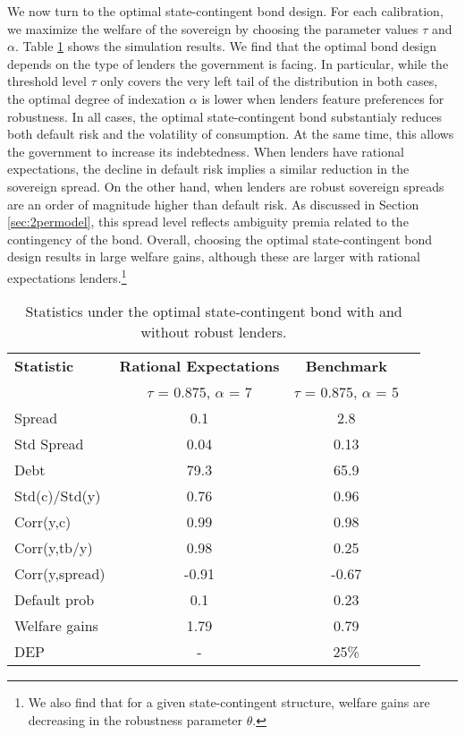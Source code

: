 We now turn to the optimal state-contingent bond design. For each calibration, we maximize the welfare of the sovereign by choosing the parameter values $\tau$ and $\alpha$. Table \ref{table:optimal_structure} shows the simulation results. We find that the optimal bond design depends on the type of lenders the government is facing. In particular, while the threshold level $\tau$ only covers the very left tail of the distribution in both cases, the optimal degree of indexation $\alpha$ is lower when lenders feature preferences for robustness. In all cases, the optimal state-contingent bond substantialy reduces both default risk and the volatility of consumption. At the same time, this allows the government to increase its indebtedness. When lenders have rational expectations, the decline in default risk implies a similar reduction in the sovereign spread. On the other hand, when lenders are robust sovereign spreads are an order of magnitude higher than default risk. As discussed in Section \ref{sec:2permodel}, this spread level reflects ambiguity premia related to the contingency of the bond. Overall, choosing the optimal state-contingent bond design results in large welfare gains, although these are larger with rational expectations lenders.\footnote{We also find that for a given state-contingent structure, welfare gains are decreasing in the robustness parameter $\theta$.}



\begin{table}[!hbtp]\centering\small 
  \caption{Statistics under the optimal state-contingent bond with and without robust lenders.} \label{table:optimal_structure}
  \begin{tabular}{@{}lccc@{}}\toprule
  \textbf{Statistic}  & \textbf{Rational Expectations} & \textbf{Benchmark}  \\
  & $\tau$ = 0.875, $\alpha$ = 7 & $\tau$ = 0.875, $\alpha$ = 5 &\\\midrule
  Spread &   0.1          &       2.8        \\
  Std Spread &   0.04          &         0.13            \\
  Debt &   79.3         &           65.9           \\
  Std(c)/Std(y) &   0.76         &           0.96          \\
  Corr(y,c) &   0.99        &           0.98        \\
  Corr(y,tb/y) &   0.98        &           0.25      \\
  Corr(y,spread) &   -0.91        &          -0.67       \\
  Default prob &  0.1             &    0.23                  \\
  Welfare gains & 1.79              & 0.79                 \\
  DEP & -              & 25\%                 \\
    \bottomrule 
  \end{tabular}
  \end{table}
  

